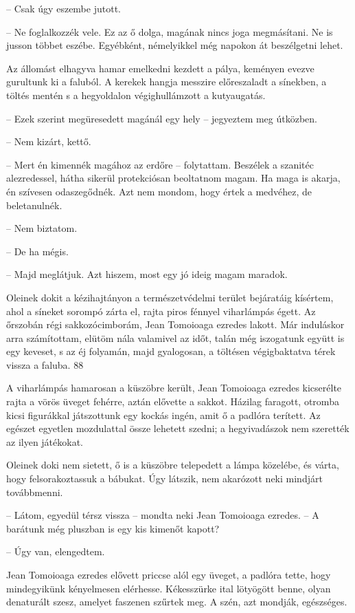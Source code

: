 \documentclass{IEEEtran}
\begin{document}
– Csak úgy eszembe jutott.

– Ne foglalkozzék vele. Ez az ő dolga, magának nincs joga megmásítani. Ne is
jusson többet eszébe. Egyébként, némelyikkel még napokon át beszélgetni lehet.

Az állomást elhagyva hamar emelkedni kezdett a pálya, keményen evezve
gurultunk ki a faluból. A kerekek hangja messzire előreszaladt a sínekben, a
töltés mentén s a hegyoldalon végighullámzott a kutyaugatás.

– Ezek szerint megüresedett magánál egy hely – jegyeztem meg útközben.

– Nem kizárt, kettő.

– Mert én kimennék magához az erdőre – folytattam. Beszélek a szanitéc
alezredessel, hátha sikerül protekciósan beoltatnom magam. Ha maga is akarja,
én szívesen odaszegődnék. Azt nem mondom, hogy értek a medvéhez, de
beletanulnék.

– Nem biztatom.

– De ha mégis.

– Majd meglátjuk. Azt hiszem, most egy jó ideig magam maradok.

Oleinek dokit a kézihajtányon a természetvédelmi terület bejáratáig kísértem,
ahol a síneket sorompó zárta el, rajta piros fénnyel viharlámpás égett. Az
őrszobán régi sakkozócimborám, Jean Tomoioaga ezredes lakott. Már induláskor
arra számítottam, elütöm nála valamivel az időt, talán még iszogatunk együtt
is egy keveset, s az éj folyamán, majd gyalogosan, a töltésen végigbaktatva
térek vissza a faluba.
88

A viharlámpás hamarosan a küszöbre került, Jean Tomoioaga ezredes kicserélte
rajta a vörös üveget fehérre, aztán elővette a sakkot. Házilag faragott,
otromba kicsi figurákkal játszottunk egy kockás ingén, amit ő a padlóra
terített. Az egészet egyetlen mozdulattal össze lehetett szedni; a
hegyivadászok nem szerették az ilyen játékokat.

Oleinek doki nem sietett, ő is a küszöbre telepedett a lámpa közelébe, és
várta, hogy felsorakoztassuk a bábukat. Úgy látszik, nem akarózott neki
mindjárt továbbmenni.

– Látom, egyedül térsz vissza – mondta neki Jean Tomoioaga ezredes. – A
barátunk még pluszban is egy kis kimenőt kapott?

– Úgy van, elengedtem.

Jean Tomoioaga ezredes elővett priccse alól egy üveget, a padlóra tette, hogy
mindegyikünk kényelmesen elérhesse. Kékesszürke ital lötyögött benne, olyan
denaturált szesz, amelyet faszenen szűrtek meg. A szén, azt mondják,
egészséges.
\end{document}
